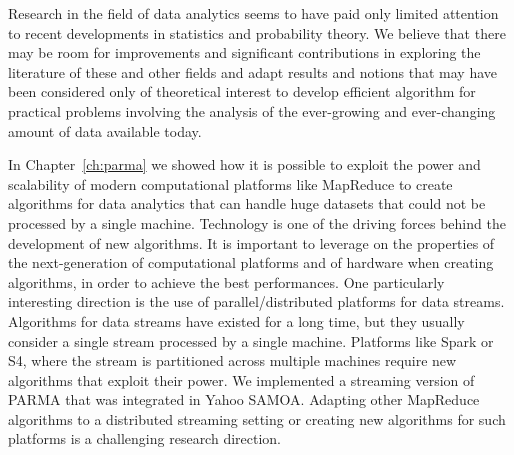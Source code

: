 Research in the field of data analytics seems to have paid only limited
attention to recent developments in statistics and probability theory. We
believe that there may be room for improvements and significant contributions in
exploring the literature of these and other fields and adapt results and notions
that may have been considered only of theoretical interest to develop efficient
algorithm for practical problems involving the analysis of the ever-growing and
ever-changing amount of data available today.

In Chapter~\ref{ch:parma} we showed how it is possible to exploit the
power and scalability of modern computational platforms like MapReduce to create
algorithms for data analytics that can handle huge datasets that could not be
processed by a single machine. Technology is one of the driving forces behind
the development of new algorithms. It is important to leverage on the properties
of the next-generation of computational platforms and of hardware when
creating algorithms, in order to achieve the best performances. One particularly
interesting direction is the use of parallel/distributed platforms for data
streams. Algorithms for data streams have existed for a long time, but they
usually consider a single stream processed by a single machine. Platforms like
Spark or S4, where the stream is partitioned across multiple machines
require new algorithms that exploit their power. We implemented a streaming version
of PARMA that was integrated in Yahoo SAMOA. Adapting other MapReduce algorithms
to a distributed streaming setting or creating new algorithms for such platforms
is a challenging research direction.

